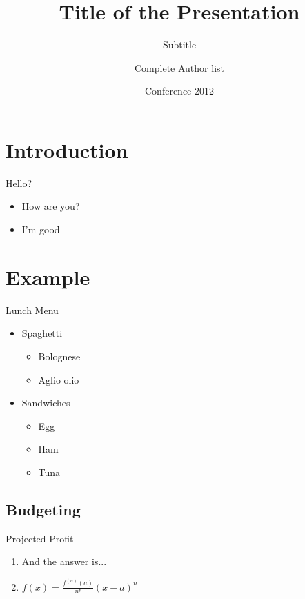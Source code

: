 \documentclass[aspectratio=1610,17pt,utf8]{beamer}
\title[Shorter Title]{Title of the Presentation}
\subtitle{Subtitle}
\author[Shorter Author]{Complete Author list}
\institute[Fakultät]
{
  Universität Passau\\
  Chair of Complex and Intelligent Systems\\
}
\date{Conference 2012}
\begin{document}
\begin{frame}[plain]
  \titlepage
\end{frame}

\begin{frame}[plain]
  \tableofcontents
\end{frame}


\section{Introduction}

\begin{frame}{Hello?}

\begin{itemize}
\item How are you?
\item I'm good
\end{itemize}
\end{frame}


\section{Example}


\begin{frame}{Lunch Menu}

\begin{itemize}
\item Spaghetti
  \begin{itemize}
  \item Bolognese
  \item Aglio olio
  \end{itemize}
\item Sandwiches
  \begin{itemize}
  \item Egg
  \item Ham
  \item Tuna
  \end{itemize}
\end{itemize}
\end{frame}


\subsection{Budgeting}

\begin{frame}{Projected Profit}

\begin{enumerate}
\item And the answer is...
\item $f(x)=\frac{f^{(n)}(a)}{n!}(x-a)^n$
\end{enumerate}

\end{frame}

\end{document}
